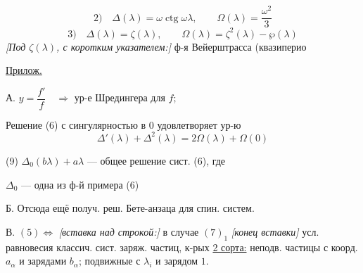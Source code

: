 \begin{equation*}
2)\quad \Delta(\lambda)=\omega\operatorname{ctg}\omega\lambda,
\qquad \Omega(\lambda)=\frac{\omega^2}{3}
\end{equation*}
\begin{equation*}
3)\quad \Delta(\lambda)=\zeta(\lambda),
\qquad \Omega(\lambda)=\zeta^2(\lambda)-\wp(\lambda)
\end{equation*}
\textit{[Под $\zeta(\lambda)$, с коротким указателем:]} ф-я Вейерштрасса
\qquad (квазиперио


\underline{Прилож.}

А. $y=\dfrac{f'}{f}\quad\Rightarrow$ ур-е Шредингера для $f$;

Решение (6) с сингулярностью в $0$ удовлетворяет ур-ю
\begin{equation*}
\Delta'(\lambda)+\Delta^2(\lambda)=2\Omega(\lambda)+\Omega(0)
\tag{8}
\end{equation*}

\begin{center}
\end{center}

(9) $\Delta_0(b\lambda)+a\lambda$ --- общее решение сист. (6), где

$\Delta_0$ --- одна из ф-й примера (6)

Б. Отсюда ещё получ. реш. Бете-анзаца для спин. систем.

В. $(5)\Leftrightarrow$
\textit{[вставка над строкой:]} в случае
$(7)_1$ \textit{[конец вставки]}
усл. равновесия классич. сист. заряж. частиц, к-рых
\underline{2 сорта:} неподв. частицы с коорд. $a_\alpha$ и зарядами $b_\alpha$;
подвижные с
$\lambda_i$ и зарядом $1$.

